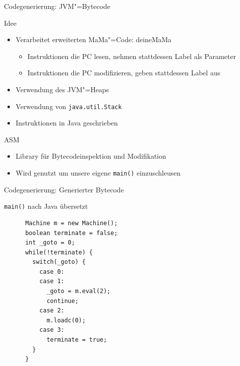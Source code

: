 \documentclass[hyperref={pdfpagelabels=false}]{beamer}
\begin{document}
\begin{frame}{Codegenerierung: JVM"=Bytecode}
  \begin{block}{Idee}
    \begin{itemize}
      \item Verarbeitet erweiterten MaMa"=Code: deineMaMa
        \begin{itemize}
          \item Instruktionen die PC lesen, nehmen stattdessen Label als Parameter
          \item Instruktionen die PC modifizieren, geben stattdessen Label aus
        \end{itemize}
      \item Verwendung des JVM"=Heaps
      \item Verwendung von \texttt{java.util.Stack}
      \item Instruktionen in Java geschrieben
    \end{itemize}
  \end{block}
  \begin{block}{ASM}
    \begin{itemize}
      \item Library für Bytecodeinspektion und Modifikation
      \item Wird genutzt um unsere eigene \texttt{main()} einzuschleusen
    \end{itemize}
  \end{block}
\end{frame}

\begin{frame}[fragile]{Codegenerierung: Generierter Bytecode}
  \begin{block}{\texttt{main()} nach Java übersetzt}
    \begin{verbatim}
      Machine m = new Machine();
      boolean terminate = false;
      int _goto = 0;
      while(!terminate) {
        switch(_goto) {
          case 0:
          case 1:
            _goto = m.eval(2);
            continue;
          case 2:
            m.loadc(0);
          case 3:
            terminate = true;
        }
      }
    \end{verbatim}
  \end{block}
\end{frame}
\end{document}
